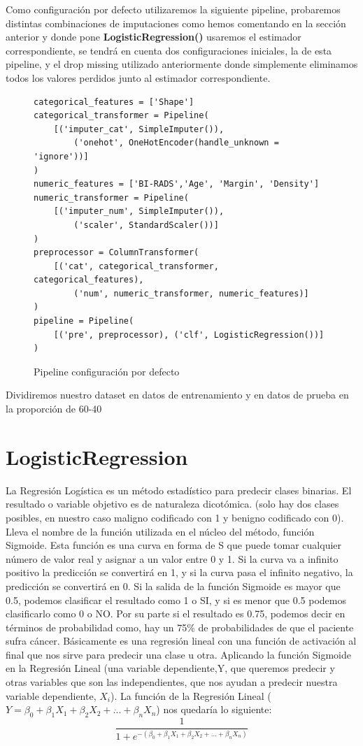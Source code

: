 \documentclass[12pt,twoside]{report}
\begin{document}
Como configuración por defecto utilizaremos la siguiente pipeline, probaremos distintas combinaciones de imputaciones como hemos comentando en la sección anterior y donde pone \textbf{LogisticRegression()} usaremos el estimador correspondiente, se tendrá en cuenta dos configuraciones iniciales, la de esta pipeline, y el drop missing utilizado anteriormente donde simplemente eliminamos todos los valores perdidos junto al estimador correspondiente.
\begin{figure}[h]
 \begin{lstlisting}
categorical_features = ['Shape']
categorical_transformer = Pipeline(
    [('imputer_cat', SimpleImputer()),
        ('onehot', OneHotEncoder(handle_unknown = 'ignore'))]
)
numeric_features = ['BI-RADS','Age', 'Margin', 'Density']
numeric_transformer = Pipeline(
    [('imputer_num', SimpleImputer()),
        ('scaler', StandardScaler())]
)
preprocessor = ColumnTransformer(
    [('cat', categorical_transformer, categorical_features),
        ('num', numeric_transformer, numeric_features)]
)
pipeline = Pipeline(
    [('pre', preprocessor), ('clf', LogisticRegression())]
)
 \end{lstlisting}
 \caption{Pipeline configuración por defecto}
 \end{figure}
 
 Dividiremos nuestro dataset en datos de entrenamiento y en datos de prueba en la proporción de 60-40
 
\section*{LogisticRegression}
La Regresión Logística es un método estadístico para predecir clases binarias. El resultado o variable objetivo es de naturaleza dicotómica. (solo hay dos clases posibles, en nuestro caso maligno codificado con 1 y benigno codificado con 0). Lleva el nombre de la función utilizada en el núcleo del método, función Sigmoide. Esta función es una curva en forma de S que puede tomar cualquier número de valor real y asignar a un valor entre 0 y 1. Si la curva va a infinito positivo la predicción se convertirá en 1, y si la curva pasa el infinito negativo, la predicción se convertirá en 0. Si la salida de la función Sigmoide es mayor que 0.5, podemos clasificar el resultado como 1 o SI, y si es menor que 0.5 podemos clasificarlo como 0 o NO. Por su parte si el resultado es 0.75, podemos decir en términos de probabilidad como, hay un 75\% de probabilidades de que el paciente sufra cáncer. Básicamente es una regresión lineal con una función de activación al final que nos sirve para predecir una clase u otra. Aplicando la función Sigmoide en la Regresión Lineal (una variable dependiente,Y, que queremos predecir y otras variables que son las independientes, que nos ayudan a predecir nuestra variable dependiente, $X_i$). La función de la Regresión Lineal ($ Y = \beta_0 + \beta_1X_1 + \beta_2X_2 + \dot{...} + \beta_nX_n  $) nos quedaría lo siguiente: $$\frac{1}{1+e^{-(\beta_0 + \beta_1X_1 + \beta_2X_2 + \dot{...} + \beta_nX_n)}}$$
\end{document}
